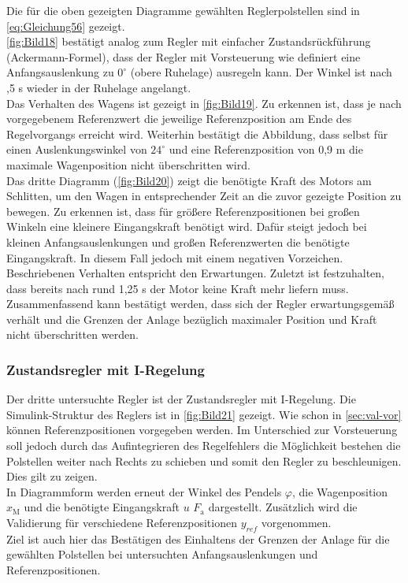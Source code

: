 \newpage
Die für die oben gezeigten Diagramme gewählten Reglerpolstellen sind in \autoref{eq:Gleichung56} gezeigt. \\
\newline
\autoref{fig:Bild18} bestätigt analog zum Regler mit einfacher Zustandsrückführung (Ackermann-Formel), dass der Regler mit Vorsteuerung wie definiert eine Anfangsauslenkung zu $0^\circ$ (obere Ruhelage) ausregeln kann. Der Winkel ist nach ,5 s wieder in der Ruhelage angelangt. \\
\newline
Das Verhalten des Wagens ist gezeigt in \autoref{fig:Bild19}. Zu erkennen ist, dass je nach vorgegebenem Referenzwert die jeweilige Referenzposition am Ende des Regelvorgangs erreicht wird. Weiterhin bestätigt die Abbildung, dass selbst für einen Auslenkungswinkel von $24^\circ$ und eine Referenzposition von 0,9 m die maximale Wagenposition nicht überschritten wird. \\
\newline
Das dritte Diagramm (\autoref{fig:Bild20}) zeigt die benötigte Kraft des Motors am Schlitten, um den Wagen in entsprechender Zeit an die zuvor gezeigte Position zu bewegen. Zu erkennen ist, dass für größere Referenzpositionen bei großen Winkeln eine kleinere Eingangskraft benötigt wird. Dafür steigt jedoch bei kleinen Anfangsauslenkungen und großen Referenzwerten die benötigte Eingangskraft. In diesem Fall jedoch mit einem negativen Vorzeichen. Beschriebenen Verhalten entspricht den Erwartungen. Zuletzt ist festzuhalten, dass bereits nach rund 1,25 s der Motor keine Kraft mehr liefern muss.\\
\newline
Zusammenfassend kann bestätigt werden, dass sich der Regler erwartungsgemäß verhält und die Grenzen der Anlage bezüglich maximaler Position und Kraft nicht überschritten werden.

\subsubsection{Zustandsregler mit I-Regelung}

Der dritte untersuchte Regler ist der Zustandsregler mit I-Regelung. Die Simulink-Struktur des Reglers ist in \autoref{fig:Bild21} gezeigt. Wie schon in \autoref{sec:val-vor} können Referenzpositionen vorgegeben werden. Im Unterschied zur Vorsteuerung soll jedoch durch das Aufintegrieren des Regelfehlers die Möglichkeit bestehen die Polstellen weiter nach Rechts zu schieben und somit den Regler zu beschleunigen. Dies gilt zu zeigen. \\
In Diagrammform werden erneut der Winkel des Pendels $\varphi$, die Wagenposition $x_{\mathrm{M}}$ und die benötigte Eingangskraft $u$ \bzw $F_{\mathrm{a}}$ dargestellt. Zusätzlich wird die Validierung für verschiedene Referenzpositionen $y_{ref}$ vorgenommen. \\
Ziel ist auch hier das Bestätigen des Einhaltens der Grenzen der Anlage für die gewählten Polstellen bei untersuchten Anfangsauslenkungen und Referenzpositionen. 

